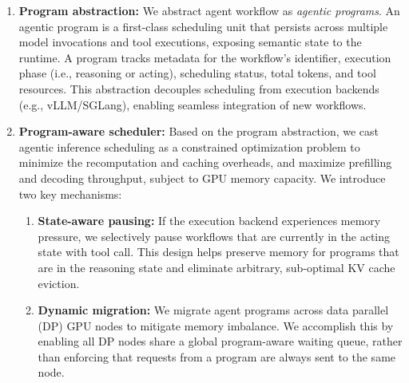 \begin{enumerate}[itemsep=0.0pt,topsep=0pt,leftmargin=*]

    \item \textbf{Program abstraction:} We abstract agent workflow as \textit{agentic programs}.
    An agentic program is a first-class scheduling unit that persists across multiple model invocations and tool executions, exposing semantic state to the runtime.
    A program tracks metadata for the workflow's identifier, execution phase  (i.e., reasoning or acting), scheduling status, total tokens, and tool resources. This abstraction decouples scheduling from execution backends (e.g., vLLM/SGLang), enabling seamless integration of new workflows.

    \item \textbf{Program-aware scheduler:} Based on the program abstraction, we cast agentic inference scheduling as a constrained optimization problem to minimize the recomputation and caching overheads, and maximize prefilling and decoding throughput, subject to GPU memory capacity.
    We introduce two key mechanisms:
    \begin{enumerate}[itemsep=0.0pt,topsep=0pt,leftmargin=*]
        \item \textbf{State-aware pausing:} If the execution backend experiences memory pressure, we selectively pause workflows that are currently in the acting state with tool call. This design helps
        preserve memory for programs that are in the reasoning state and eliminate arbitrary, sub-optimal KV cache eviction.
        \item \textbf{Dynamic migration:} We migrate agent programs across data parallel (DP) GPU nodes to mitigate memory imbalance. We accomplish this by
        enabling all DP nodes share a global program-aware waiting queue, rather than enforcing that requests from a program are always sent to the same node.
    \end{enumerate}


\end{enumerate}
